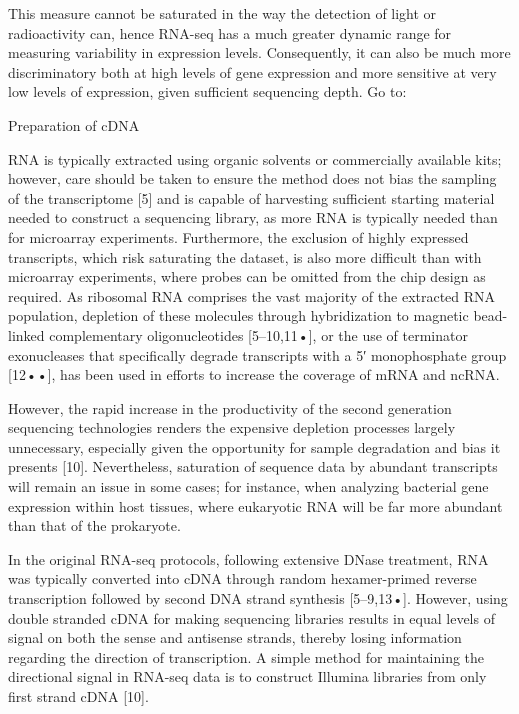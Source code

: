 \documentclass[a4paper]{thesis}
\begin{document}
 This measure cannot be saturated in the way the detection of light or radioactivity can, hence RNA-seq has a much greater dynamic range for measuring variability in expression levels. Consequently, it can also be much more discriminatory both at high levels of gene expression and more sensitive at very low levels of expression, given sufficient sequencing depth.
Go to:

Preparation of cDNA


RNA is typically extracted using organic solvents or commercially available kits; however, care should be taken to ensure the method does not bias the sampling of the transcriptome [5] and is capable of harvesting sufficient starting material needed to construct a sequencing library, as more RNA is typically needed than for microarray experiments. Furthermore, the exclusion of highly expressed transcripts, which risk saturating the dataset, is also more difficult than with microarray experiments, where probes can be omitted from the chip design as required. As ribosomal RNA comprises the vast majority of the extracted RNA population, depletion of these molecules through hybridization to magnetic bead-linked complementary oligonucleotides [5–10,11•], or the use of terminator exonucleases that specifically degrade transcripts with a 5′ monophosphate group [12••], has been used in efforts to increase the coverage of mRNA and ncRNA.

However, the rapid increase in the productivity of the second generation sequencing technologies renders the expensive depletion processes largely unnecessary, especially given the opportunity for sample degradation and bias it presents [10]. Nevertheless, saturation of sequence data by abundant transcripts will remain an issue in some cases; for instance, when analyzing bacterial gene expression within host tissues, where eukaryotic RNA will be far more abundant than that of the prokaryote.

In the original RNA-seq protocols, following extensive DNase treatment, RNA was typically converted into cDNA through random hexamer-primed reverse transcription followed by second DNA strand synthesis [5–9,13•]. However, using double stranded cDNA for making sequencing libraries results in equal levels of signal on both the sense and antisense strands, thereby losing information regarding the direction of transcription. A simple method for maintaining the directional signal in RNA-seq data is to construct Illumina libraries from only first strand cDNA [10].
\end{document}
